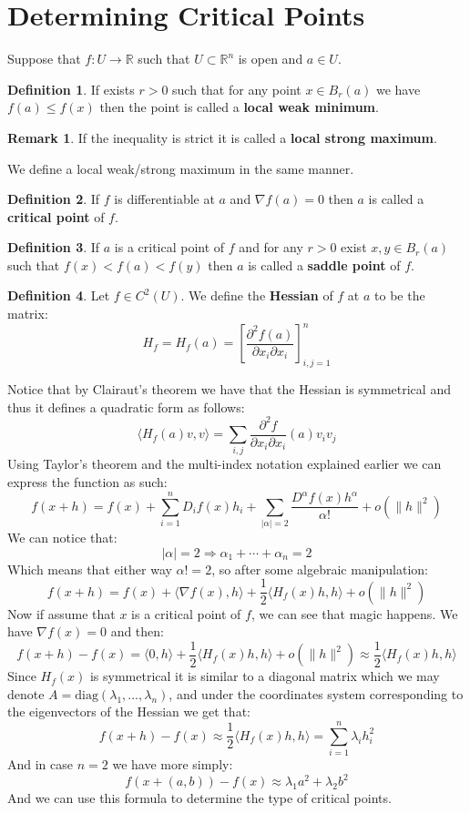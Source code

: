 \documentclass[11pt,a4paper]{article}
\theoremstyle{definition}
\newtheorem{definition}{Definition}[section]
\newtheorem{remark}{Remark}[section]
\theoremstyle{plain}
\newcommand{\R}{\mathbb{R}}
\newcommand{\ip}[2]{\langle #1, #2 \rangle}
\begin{document}
	\section{Determining Critical Points}
	Suppose that $f \colon U \to \R$ such that $U \subset \R^n$ is open
	and $a \in U$.
	\begin{definition}
		If exists $r > 0$ such that for any point $x \in B_r(a)$ we have
		$f(a) \le f(x)$ then the point is called a \textbf{local weak minimum}.
	\end{definition}
	\begin{remark}
		If the inequality is strict it is called a \textbf{local strong
		maximum}.
	\end{remark}
	\noindent We define a local weak/strong maximum in the same manner.
	\begin{definition}
		If $f$ is differentiable at $a$ and $\nabla f(a) = 0$ then $a$
		is called a \textbf{critical point} of $f$.
	\end{definition}
	\begin{definition}
		If $a$ is a critical point of $f$ and for any $r > 0$ exist 
		$x,y \in B_r(a)$ such that $f(x) < f(a) < f(y)$ then $a$ is called
		a \textbf{saddle point} of $f$.
	\end{definition}
	\begin{definition}
		Let $f \in C^2(U)$. We define the \textbf{Hessian} of $f$ at $a$ to be
		the matrix:
		\[
			H_f = H_f(a) = 
			\left[ \frac{\partial^2 f(a)}{\partial x_i \partial x_i} \right]_
			{i,j = 1}^{n}
		\]
	\end{definition}
	Notice that by Clairaut's theorem we have that the Hessian is symmetrical
	and thus it defines a quadratic form as follows:
	\[
		\ip{H_f(a)v}{v} = \sum_{i,j}
		{\frac{\partial^2 f}{\partial x_i \partial x_i}(a)v_i v_j}
	\]
	Using Taylor's theorem and the multi-index notation explained earlier
	we can express the function as such:
	\[
		f(x + h) = f(x) + \sum_{i=1}^{n}{D_i f(x) h_i} + 
		\sum_{|\alpha|=2}{\frac{D^\alpha f(x) h^\alpha}{\alpha!}} + o(\|h\|^2)
	\]
	We can notice that:
	\[
		|\alpha| = 2 \Rightarrow \alpha_1 + \cdots + \alpha_n = 2
	\]
	Which means that either way $\alpha! = 2$, so after some algebraic
	manipulation:
	\[
		f(x + h) = f(x) + \ip{\nabla f(x)}{h} + \frac{1}{2}\ip{H_f(x)h}{h}
		+ o(\|h\|^2)
	\]
	Now if assume that $x$ is a critical point of $f$, we can see that magic
	happens. We have $\nabla f(x) = 0$ and then:
	\[
		f(x + h) - f(x) = \ip{0}{h} + \frac{1}{2}\ip{H_f(x)h}{h}
		+ o(\|h\|^2) \approx \frac{1}{2}\ip{H_f(x)h}{h}
	\]
	Since $H_f(x)$ is symmetrical it is similar to a diagonal matrix
	which we may denote $A = \mathrm{diag}(\lambda_1,\dots,\lambda_n)$,
	and under the coordinates system corresponding to the eigenvectors
	of the Hessian we get that:
	\[
		f(x + h) - f(x) \approx \frac{1}{2}\ip{H_f(x)h}{h} = 
		\sum_{i=1}^{n}{\lambda_i h_i^2}
	\]
	And in case $n = 2$ we have more simply:
	\[
		f(x + (a,b)) - f(x) \approx \lambda_1 a^2 + \lambda_2 b^2
	\]
	And we can use this formula to determine the type of critical points.
	
\end{document}
